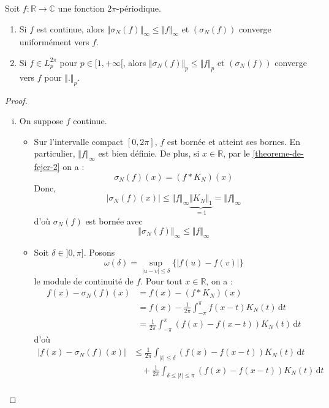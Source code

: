 
	\begin{theorem}[Fejér]
		Soit $f : \mathbb{R} \rightarrow \mathbb{C}$ une fonction $2\pi$-périodique.
		\begin{enumerate}
			\item Si $f$ est continue, alors $\Vert \sigma_N(f) \Vert_\infty \leq \Vert f \Vert_\infty$ et $(\sigma_N(f))$ converge uniformément vers $f$.
			\item Si $f \in L_p^{2\pi}$ pour $p \in [1,+\infty[$, alors $\Vert \sigma_N(f) \Vert_p \leq \Vert f \Vert_p$ et $(\sigma_N(f))$ converge vers $f$ pour $\Vert . \Vert_p$.
		\end{enumerate}
	\end{theorem}
	
	\begin{proof}
		\begin{enumerate}[(i)]
			\item On suppose $f$ continue.
			\begin{itemize}
				\item Sur l'intervalle compact $[0, 2\pi]$, $f$ est bornée et atteint ses bornes. En particulier, $\Vert f \Vert_\infty$ est bien définie. De plus, si $x \in \mathbb{R}$, par le \cref{theoreme-de-fejer-2} on a :
				\[ \sigma_N(f)(x) = (f * K_N)(x) \]
				Donc,
				\[ \vert \sigma_N(f)(x) \vert \leq \Vert f \Vert_\infty \underbrace{\Vert K_N \Vert_1}_{=1} = \Vert f \Vert_\infty \]
				d'où $\sigma_N(f)$ est bornée avec 
				\[ \Vert \sigma_N(f) \Vert_\infty \leq \Vert f \Vert_\infty \]
				\item Soit $\delta \in ]0,\pi]$. Posons
				\[ \omega(\delta) = \sup_{\vert u - v \vert \leq \delta} \{ \vert f(u) - f(v) \vert \} \]
				le module de continuité de $f$. Pour tout $x \in \mathbb{R}$, on a :
				\begin{align*}
					f(x) - \sigma_N(f)(x) &= f(x) - (f * K_N)(x) \\
					&= f(x) - \frac{1}{2\pi} \int_{-\pi}^{\pi} f(x-t) K_N(t) \, \mathrm{d}t \\
					&= \frac{1}{2\pi} \int_{-\pi}^{\pi} (f(x) - f(x-t)) K_N(t) \, \mathrm{d}t \tag{*}
				\end{align*}
				d'où
				\begin{align*}
					\vert f(x) - \sigma_N(f)(x) \vert &\leq \frac{1}{2\pi} \int_{\vert t \vert \leq \delta} (f(x) - f(x-t)) K_N(t) \, \mathrm{d}t \\
					&\quad + \frac{1}{2\pi} \int_{\delta \leq \vert t \vert \leq \pi} (f(x) - f(x-t)) K_N(t) \, \mathrm{d}t \\

\end{align*}
\end{itemize}
\end{enumerate}
\end{proof}

